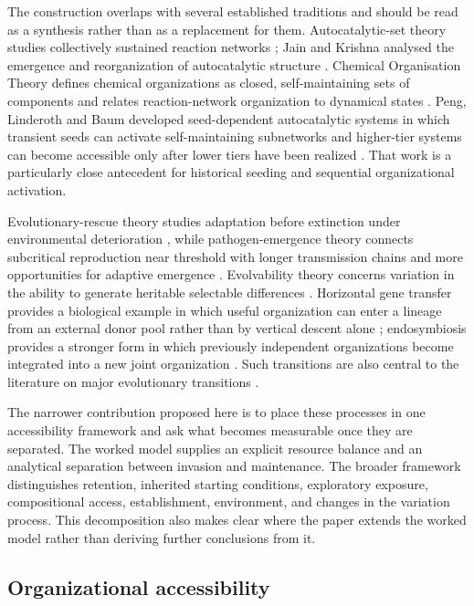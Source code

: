 \documentclass[11pt,a4paper]{article}
\begin{document}
The construction overlaps with several established traditions and should be read as a synthesis rather than as a replacement for them. Autocatalytic-set theory studies collectively sustained reaction networks \citep{Hordijk2010,Hordijk2012}; Jain and Krishna analysed the emergence and reorganization of autocatalytic structure \citep{Jain1998,Jain2001}. Chemical Organisation Theory defines chemical organizations as closed, self-maintaining sets of components and relates reaction-network organization to dynamical states \citep{Dittrich2007}. Peng, Linderoth and Baum developed seed-dependent autocatalytic systems in which transient seeds can activate self-maintaining subnetworks and higher-tier systems can become accessible only after lower tiers have been realized \citep{Peng2022}. That work is a particularly close antecedent for historical seeding and sequential organizational activation.

Evolutionary-rescue theory studies adaptation before extinction under environmental deterioration \citep{Bell2017,Ferriere2013}, while pathogen-emergence theory connects subcritical reproduction near threshold with longer transmission chains and more opportunities for adaptive emergence \citep{Antia2003,Woolhouse2005}. Evolvability theory concerns variation in the ability to generate heritable selectable differences \citep{WagnerAltenberg1996,Gerhart2007}. Horizontal gene transfer provides a biological example in which useful organization can enter a lineage from an external donor pool rather than by vertical descent alone \citep{Soucy2015}; endosymbiosis provides a stronger form in which previously independent organizations become integrated into a new joint organization \citep{Archibald2015}. Such transitions are also central to the literature on major evolutionary transitions \citep{SzathmarySmith1995}.

The narrower contribution proposed here is to place these processes in one accessibility framework and ask what becomes measurable once they are separated. The worked model supplies an explicit resource balance and an analytical separation between invasion and maintenance. The broader framework distinguishes retention, inherited starting conditions, exploratory exposure, compositional access, establishment, environment, and changes in the variation process. This decomposition also makes clear where the paper extends the worked model rather than deriving further conclusions from it.

\subsection{Organizational accessibility}
\end{document}

